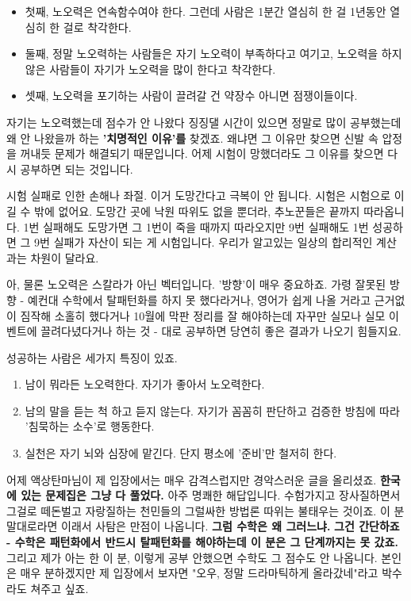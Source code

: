 \begin{itemize}
    \item 첫째, 노오력은 연속함수여야 한다. 그런데 사람은 1분간 열심히 한 걸 1년동안 열심히 한 걸로 착각한다.
    \item 둘째, 정말 노오력하는 사람들은 자기 노오력이 부족하다고 여기고, 노오력을 하지 않은 사람들이 자기가 노오력을 많이 한다고 착각한다.
    \item 셋째, 노오력을 포기하는 사람이 끌려갈 건 약장수 아니면 점쟁이들이다.
\end{itemize}
\vspace{5mm}

자기는 노오력했는데 점수가 안 나왔다 징징댈 시간이 있으면
정말로 많이 공부했는데 왜 안 나왔을까 하는 \textbf{'치명적인 이유'를} 찾겠죠.
왜냐면 그 이유만 찾으면 신발 속 압정을 꺼내듯 문제가 해결되기 때문입니다.
어제 시험이 망했더라도 그 이유를 찾으면 다시 공부하면 되는 것입니다.
\vspace{5mm}

시험 실패로 인한 손해나 좌절. 이거 도망간다고 극복이 안 됩니다.
시험은 시험으로 이길 수 밖에 없어요. 도망간 곳에 낙원 따위도 없을 뿐더라, 추노꾼들은 끝까지 따라옵니다.
1번 실패해도 도망가면 그 1번이 죽을 때까지 따라오지만
9번 실패해도 1번 성공하면 그 9번 실패가 자산이 되는 게 시험입니다.
우리가 알고있는 일상의 합리적인 계산과는 차원이 달라요.
\vspace{5mm}

아, 물론 노오력은 스칼라가 아닌 벡터입니다. '방향'이 매우 중요하죠.
가령 잘못된 방향 - 예컨대 수학에서 탈패턴화를 하지 못 했다라거나, 영어가 쉽게 나올 거라고 근거없이 짐작해 소홀히 했다거나
10월에 막판 정리를 잘 해야하는데 자꾸만 실모나 실모 이벤트에 끌려다녔다거나 하는 것 - 대로 공부하면 당연히 좋은 결과가 나오기 힘들지요.
\vspace{5mm}

성공하는 사람은 세가지 특징이 있죠.
\vspace{5mm}
\begin{enumerate}
    \item 남이 뭐라든 노오력한다. 자기가 좋아서 노오력한다.
    \item 남의 말을 듣는 척 하고 듣지 않는다. 자기가 꼼꼼히 판단하고 검증한 방침에 따라 '침묵하는 소수'로 행동한다.
    \item 실천은 자기 뇌와 심장에 맡긴다. 단지 평소에 '준비'만 철저히 한다.
\end{enumerate}
\vspace{5mm}

어제 액상탄마님이 제 입장에서는 매우 감격스럽지만 경악스러운 글을 올리셨죠.
\textbf{한국에 있는 문제집은 그냥 다 풀었다.}
아주 명쾌한 해답입니다. 수험가지고 장사질하면서 그걸로 떼돈벌고 자랑질하는 천민들의 그럴싸한 방법론 따위는 불태우는 것이죠.
이 분 말대로라면 이래서 사탐은 만점이 나옵니다.
\textbf{그럼 수학은 왜 그러느냐.}
\textbf{그건 간단하죠 - 수학은 패턴화에서 반드시 탈패턴화를 해야하는데 이 분은 그 단계까지는 못 갔죠.}
그리고 제가 아는 한 이 분, 이렇게 공부 안했으면 수학도 그 점수도 안 나옵니다.
본인은 매우 분하겠지만 제 입장에서 보자면 "오우, 정말 드라마틱하게 올라갔네"라고 박수라도 쳐주고 싶죠.
\vspace{5mm}

